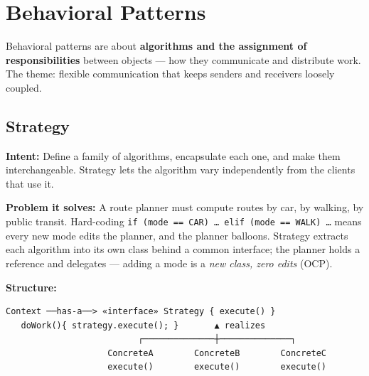 \documentclass[11pt]{article}
\begin{document}
\section{Behavioral Patterns}\label{behavioral-patterns}

Behavioral patterns are about \textbf{algorithms and the assignment of responsibilities} between objects --- how they communicate and distribute work. The theme: flexible communication that keeps senders and receivers loosely coupled.

\subsection{Strategy}\label{strategy}

\textbf{Intent:} Define a family of algorithms, encapsulate each one, and make them interchangeable. Strategy lets the algorithm vary independently from the clients that use it.

\textbf{Problem it solves:} A route planner must compute routes by car, by walking, by public transit. Hard-coding \texttt{if\ (mode\ ==\ CAR)\ …\ elif\ (mode\ ==\ WALK)\ …} means every new mode edits the planner, and the planner balloons. Strategy extracts each algorithm into its own class behind a common interface; the planner holds a reference and delegates --- adding a mode is a \emph{new class, zero edits} (OCP).

\textbf{Structure:}

\setcodelang{}

\begin{verbatim}
Context ──has-a──> «interface» Strategy { execute() }
   doWork(){ strategy.execute(); }       ▲ realizes
                          ┌──────────────┼──────────────┐
                    ConcreteA        ConcreteB        ConcreteC
                    execute()        execute()        execute()
\end{verbatim}

\end{document}
